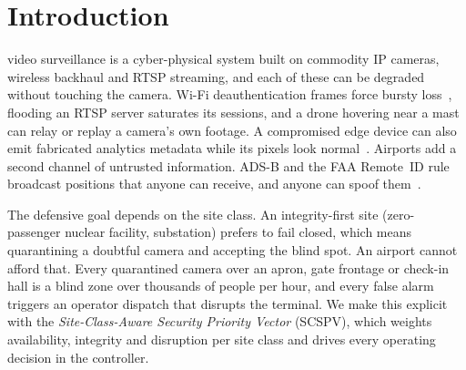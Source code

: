 \documentclass[journal]{IEEEtran}
\theoremstyle{remark}
\begin{document}
\section{Introduction}
 video surveillance is a cyber-physical system built on commodity IP cameras, wireless backhaul
and RTSP streaming, and each of these can be degraded without touching the camera. Wi-Fi deauthentication frames force
bursty loss~\cite{bellardo2003deauth}, flooding an RTSP server saturates its sessions, and a drone hovering near a mast
can relay or replay a camera's own footage. A compromised edge device can also emit fabricated analytics metadata while
its pixels look normal~\cite{costin2016iotcam}. Airports add a second channel of untrusted information. ADS-B and the
FAA Remote~ID rule~\cite{faa2021remoteid} broadcast positions that anyone can receive, and anyone can spoof
them~\cite{strohmeier2015security}.

The defensive goal depends on the site class. An integrity-first site (zero-passenger nuclear facility, substation)
prefers to fail closed, which means quarantining a doubtful camera and accepting the blind spot. An airport cannot
afford that. Every quarantined camera over an apron, gate frontage or check-in hall is a blind zone over thousands of
people per hour, and every false alarm triggers an operator dispatch that disrupts the terminal. We make this explicit
with the \emph{Site-Class-Aware Security Priority Vector} (SCSPV), which weights availability, integrity and disruption
per site class and drives every operating decision in the controller.
\end{document}
